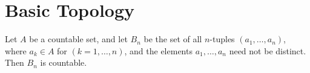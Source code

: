 \chapter{Basic Topology}

\setcounter{theorem}{12}
\begin{theorem}
	\label{theorem-2.13}
	Let $A$ be a countable set, and let $B_n$ be the set of all $n$-tuples $\left( a_1, \ldots, a_n \right)$, where $a_k \in A$ for $\left( k = 1, \ldots, n \right)$, and the elements $a_1, \ldots, a_n$ need not be distinct. Then $B_n$ is countable.
\end{theorem}



